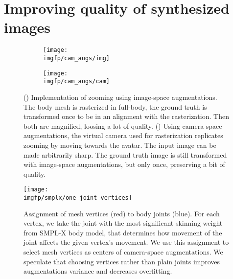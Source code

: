 \section{Improving quality of synthesized images}\label{methods:zooms}
\begin{figure}
	\centering
	\begin{subfigure}[b]{0.48\textwidth}
		\centering
		\texttt{[image: \\imgfp/cam\_augs/img]}%
		\caption{}
		\label{fig:cam_aug:before}
	\end{subfigure}
	\begin{subfigure}[b]{0.48\textwidth}
		\centering
		\texttt{[image: \\imgfp/cam\_augs/cam]}%
		\caption{}
		\label{fig:cam_aug:after}
	\end{subfigure}
	\caption{(\protect{}) Implementation of zooming using image-space augmentations. The body mesh is rasterized in full-body, the ground truth is transformed once to be in an alignment with the rasterization. Then both are magnified, loosing a lot of quality. (\protect{}) Using camera-space augmentations, the virtual camera used for rasterization replicates zooming by moving towards the avatar. The input image can be made arbitrarily sharp. The ground truth image is still transformed with image-space augmentations, but only once, preserving a bit of quality. }
	\label{fig:cam_aug}
\end{figure}

\begin{figure}
	\centering
		\texttt{[image: \\imgfp/smplx/one-joint-vertices]}%
	\caption{Assignment of mesh vertices (red) to body joints (blue). For each vertex, we take the joint with the most significant skinning weight from SMPL-X body model, that determines how movement of the joint affects the given vertex's movement. We use this assignment to select mesh vertices as centers of camera-space augmentations. We speculate that choosing vertices rather than plain joints improves augmentations variance and decreases overfitting.}
	\label{fig:smplx-vert2joint}
\end{figure}

